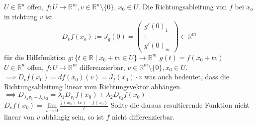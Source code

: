   \(U\in\mathbb{R}^n\) offen, \(f:U\rightarrow \mathbb{R}^m, v\in\mathbb{R}^n\setminus\{0\}\), \(x_0\in U\). Die Richtungsableitung von \(f\) bei \(x_o\) in richtung \(v\) ist \[D_v f(x_o) := J_g(0)=\begin{pmatrix}g'(0)_1\\\vdots\\g'(0)_m\end{pmatrix}\in\mathbb R^m\] für die Hilfsfunktion \(g : \{t\in\mathbb R\mid x_0 + tv\in U\}\rightarrow \mathbb R ^m\) \(g(t)=f(x_0+tv)\)\\
  \(U\in\mathbb R^n\) offen, \(f:U\rightarrow\mathbb R^m\) differenzierbar, \(v\in\mathbb R^m\setminus\{0\}, x_0\in U\). \\\(\implies D_vf(x_0)=df(x_0)(v)=J_f(x_0)\cdot v\) was auch bedeutet, dass die Richtungsableitung linear vom Richtungsvektor abhängen.\\
  \(\implies D_{\lambda_1v_1+\lambda_2v_2}=\lambda_1D_{v_1}f(x_0)+\lambda_2D_{v_2}f(x_0)\)\\
  \(D_vf(x_0)=\lim\limits_{t\rightarrow0}\frac{f(x_0+tv)-f(x_0)}{t}\) Sollte die
  daraus resultierende Funktion nicht linear von \(v\) abhängig sein, so ist
  \(f\) nicht differenzierbar.
